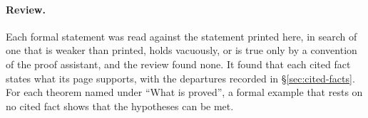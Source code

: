 \paragraph{Review.} Each formal statement
was read against the statement printed here, in search of one that is weaker than printed, holds
vacuously, or is true only by a convention of the proof assistant, and the review found none. It
found that each cited fact states what its page supports, with the departures recorded in
\S\ref{sec:cited-facts}. For each theorem named under ``What is proved'', a formal example that rests
on no cited fact shows that the hypotheses can be met.

